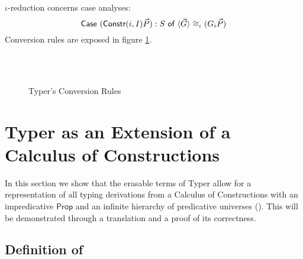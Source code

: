 \documentclass[10pt]{article}
\begin{document}
$\iota$-reduction concerns case analyses:
$$\textsf{Case}\ (\textsf{Constr} (i,I)\vec{P}):S\ \textsf{of}\ \langle\vec{G}\rangle \cong_{\iota} (G_i\vec{P})$$
Conversion rules are exposed in figure \ref{fig:conv}.

\begin{figure}[h]
  \label{fig:conv}
  \ \\ \ \\  
  \caption{Typer's Conversion Rules}
\end{figure}

\section{Typer as an Extension of a Calculus of Constructions}
In this section we show that the erasable terms of Typer allow for a representation of all typing derivations from a Calculus of Constructions with an impredicative $\mathsf{Prop}$ and an infinite hierarchy of predicative universes (\CC). This will be demonstrated through a translation and a proof of its correctness.

\subsection{Definition of \CC}
\end{document}
